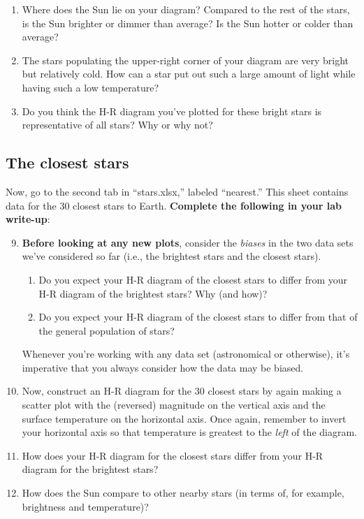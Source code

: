 \documentclass[11pt]{article}
\begin{document}
\begin{enumerate}
    \item Where does the Sun lie on your diagram? Compared to the rest of the stars, is the Sun brighter or dimmer than average? Is the Sun hotter or colder than average?
    
    \item The stars populating the upper-right corner of your diagram are very bright but relatively cold. How can a star put out such a large amount of light while having such a low temperature?
    
    \item Do you think the H-R diagram you've plotted for these bright stars is representative of all stars? Why or why not?
    
\end{enumerate}

\subsection{The closest stars}
Now, go to the second tab in ``stars.xlsx,'' labeled ``nearest.'' This sheet contains data for the 30 closest stars to Earth. \textbf{Complete the following in your lab write-up}:
\begin{enumerate}
\setcounter{enumi}{8}

    \item \textbf{Before looking at any new plots}, consider the \emph{biases} in the two data sets we've considered so far (i.e., the brightest stars and the closest stars). 
    \begin{enumerate}
        \item Do you expect your H-R diagram of the closest stars to differ from your H-R diagram of the brightest stars? Why (and how)?
        
        \item Do you expect your H-R diagram of the closest stars to differ from that of the general population of stars?
    \end{enumerate}
    Whenever you're working with any data set (astronomical or otherwise), it's imperative that you always consider how the data may be biased.
    
    \item Now, construct an H-R diagram for the 30 closest stars by again making a scatter plot with the (reversed) magnitude on the vertical axis and the surface temperature on the horizontal axis. Once again, remember to invert your horizontal axis so that temperature is greatest to the \emph{left} of the diagram.
    
    \item How does your H-R diagram for the closest stars differ from your H-R diagram for the brightest stars?
    
    \item How does the Sun compare to other nearby stars (in terms of, for example, brightness and temperature)?
    
\end{enumerate}
\end{document}

